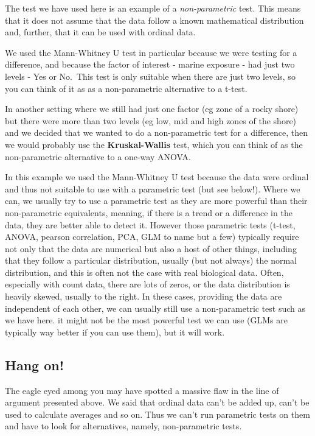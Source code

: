 \documentclass[
  letterpaper,
  DIV=11,
  numbers=noendperiod]{scrreprt}
\begin{document}
The test we have used here is an example of a \emph{non-parametric}
test. This means that it does not assume that the data follow a known
mathematical distribution and, further, that it can be used with ordinal
data.

We used the Mann-Whitney U test in particular because we were testing
for a difference, and because the factor of interest - marine exposure -
had just two levels - Yes or No.~This test is only suitable when there
are just two levels, so you can think of it as as a non-parametric
alternative to a t-test.

In another setting where we still had just one factor (eg zone of a
rocky shore) but there were more than two levels (eg low, mid and high
zones of the shore) and we decided that we wanted to do a non-parametric
test for a difference, then we would probably use the
\textbf{Kruskal-Wallis} test, which you can think of as the
non-parametric alternative to a one-way ANOVA.

In this example we used the Mann-Whitney U test because the data were
ordinal and thus not suitable to use with a parametric test (but see
below!). Where we can, we usually try to use a parametric test as they
are more powerful than their non-parametric equivalents, meaning, if
there is a trend or a difference in the data, they are better able to
detect it. However those parametric tests (t-test, ANOVA, pearson
correlation, PCA, GLM to name but a few) typically require not only that
the data are numerical but also a host of other things, including that
they follow a particular distribution, usually (but not always) the
normal distribution, and this is often not the case with real biological
data. Often, especially with count data, there are lots of zeros, or the
data distribution is heavily skewed, usually to the right. In these
cases, providing the data are independent of each other, we can usually
still use a non-parametric test such as we have here. it might not be
the most powerful test we can use (GLMs are typically way better if you
can use them), but it will work.

\subsection{Hang on!}\label{hang-on}

The eagle eyed among you may have spotted a massive flaw in the line of
argument presented above. We said that ordinal data can't be added up,
can't be used to calculate averages and so on. Thus we can't run
parametric tests on them and have to look for alternatives, namely,
non-parametric tests.
\end{document}
